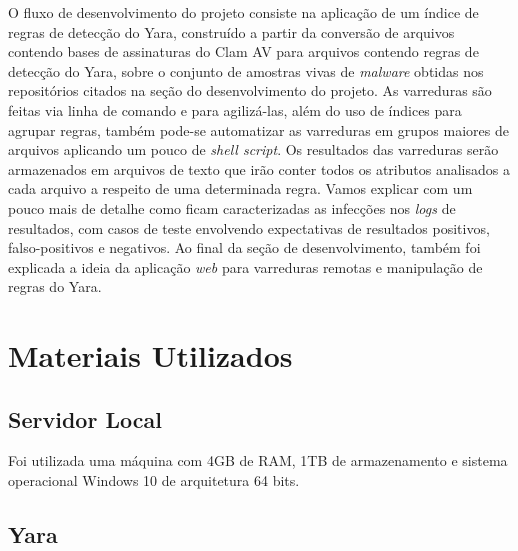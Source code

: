 O fluxo de desenvolvimento do projeto consiste na aplicação de um índice de
regras de detecção do Yara, construído a partir da conversão de arquivos
contendo bases de assinaturas do Clam AV para arquivos contendo regras de
detecção do Yara, sobre o conjunto de amostras vivas de \textit{malware} obtidas
nos repositórios citados na seção do desenvolvimento do projeto. As varreduras
são feitas via linha de comando e para agilizá-las, além do uso de índices para
agrupar regras, também pode-se automatizar as varreduras em grupos maiores de
arquivos aplicando um pouco de \textit{shell script}. Os resultados das
varreduras serão armazenados em arquivos de texto que irão conter todos os
atributos analisados a cada arquivo a respeito de uma determinada regra. Vamos
explicar com um pouco mais de detalhe como ficam caracterizadas as infecções nos
\textit{logs} de resultados, com casos de teste envolvendo expectativas de
resultados positivos, falso-positivos e negativos. Ao final da seção de
desenvolvimento, também foi explicada a ideia da aplicação \textit{web} para
varreduras remotas e manipulação de regras do Yara.

\section{Materiais Utilizados}
\label{l.material}

\subsection{Servidor Local} %
\label{sub:servidor}

Foi utilizada uma máquina com 4GB de RAM, 1TB de armazenamento e sistema operacional Windows 10 de arquitetura 64 bits.

\subsection{Yara}
\label{sub:Yara}

